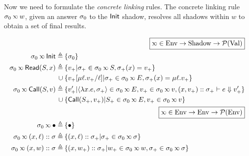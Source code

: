 Now we need to formulate the \emph{concrete linking} rules.
The concrete linking rule $\ctx_0\semlink w$, given an answer $\sigma_0$ to the $\mathsf{Init}$ shadow, resolves all shadows within $w$ to obtain a set of final results.

\begin{align*}
                                                         & \pushright{\fbox{$\semlink\in\Ctx\rightarrow\Event\rightarrow\pset{\Value}$}}                                                      \\
  \ctx_0\semlink\InitE\triangleq                         & \: \{\ctx_0\}                                                                                                                      \\
  \ctx_0\semlink\ReadE(\event,x)\triangleq               & \: \{v_+|\ctx_+\in\ctx_0\semlink\event,\ctx_+(x)=v_+\}                                                                             \\
  \cup                                                   & \: \{v_+[\mu\ell.v_+/\ell]|\ctx_+\in\ctx_0\semlink E,\ctx_+(x)=\mu\ell.v_+\}                                                       \\
  \ctx_0\semlink\CallE(\event,v)\triangleq               & \: \{v_+'|\langle\lambda x.e,\ctx_+\rangle\in\ctx_0\semlink E, v_+\in\ctx_0\semlink v, (x,v_+)\cons\ctx_+\vdash e\Downarrow v_+'\} \\
  \cup                                                   & \: \{\CallE(\event_+,v_+)|\event_+\in\ctx_0\semlink E, v_+\in\ctx_0\semlink v\}                                                    \\
                                                         & \pushright{\fbox{$\semlink\in\Ctx\rightarrow\Ctx\rightarrow\pset{\Ctx}$}}                                                          \\
  \ctx_0\semlink\bullet\triangleq                        & \: \{\bullet\}                                                                                                                     \\
  \ctx_0\semlink(x,\ell)\cons\ctx\triangleq              & \: \{(x,\ell)\cons\ctx_+|\ctx_+\in\ctx_0\semlink\ctx\}                                                                             \\
  \ctx_0\semlink(x,w)\cons\ctx\triangleq                 & \: \{(x,w_+)\cons\ctx_+|w_+\in\ctx_0\semlink w,\ctx_+\in\ctx_0\semlink\ctx\}                                                       \\

\end{align*}
